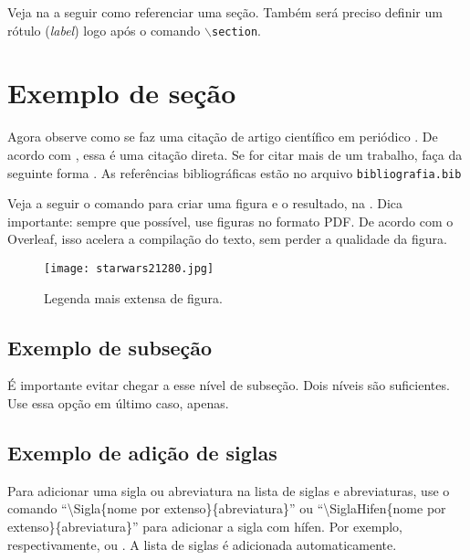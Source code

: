 %
%

Veja na  a seguir como referenciar uma seção. Também será preciso definir um rótulo (\textit{label}) logo após o comando \texttt{$\backslash$section}.

\section{Exemplo de seção}\label{sec:exemplo_secao} 
Agora observe como se faz uma citação de artigo científico em periódico \cite{Gradvohl2014c}. De acordo com \textcite{Gradvohl2016}, essa é uma citação direta. Se for citar mais de um trabalho, faça da seguinte forma \cite{Caldana2017,Gradvohl2015}. As referências bibliográficas estão no arquivo \texttt{bibliografia.bib}

Veja a seguir o comando para criar uma figura e o resultado, na . Dica importante: sempre que possível, use figuras no formato PDF. De acordo com o Overleaf, isso acelera a compilação do texto, sem perder a qualidade da figura.

\begin{figure}[!htb]
\centering
\texttt{[image: starwars21280.jpg]}
\caption[Legenda curta de figura]{Legenda mais extensa de figura.}
\label{fig:xwing}
\end{figure}

\subsection{Exemplo de subseção}
É importante evitar chegar a esse nível de subseção. Dois níveis são suficientes. Use essa opção em último caso, apenas.


\subsection{Exemplo de adição de siglas}
Para adicionar uma sigla ou abreviatura na lista de siglas e abreviaturas, use o comando ``\textbackslash{}Sigla\{nome por extenso\}\{abreviatura\}'' ou ``\textbackslash{}SiglaHifen\{nome por extenso\}\{abreviatura\}'' para adicionar a sigla com hífen. 
Por exemplo, respectivamente,  ou . A lista de siglas é adicionada automaticamente.

